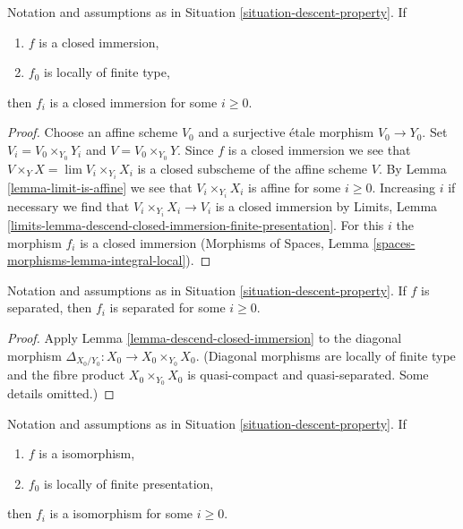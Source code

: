 \begin{lemma}
\label{lemma-descend-closed-immersion}
Notation and assumptions as in Situation \ref{situation-descent-property}. If
\begin{enumerate}
\item $f$ is a closed immersion,
\item $f_0$ is locally of finite type,
\end{enumerate}
then $f_i$ is a closed immersion for some $i \geq 0$.
\end{lemma}

\begin{proof}
Choose an affine scheme $V_0$ and a surjective \'etale morphism $V_0 \to Y_0$.
Set $V_i = V_0 \times_{Y_0} Y_i$ and $V = V_0 \times_{Y_0} Y$.
Since $f$ is a closed immersion we see that
$V \times_Y X = \lim V_i \times_{Y_i} X_i$
is a closed subscheme of the affine scheme $V$. By
Lemma \ref{lemma-limit-is-affine} we see that
$V_i \times_{Y_i} X_i$ is affine for some $i \geq 0$. Increasing $i$ if
necessary we find that $V_i \times_{Y_i} X_i \to V_i$ is a closed immersion by
Limits, Lemma \ref{limits-lemma-descend-closed-immersion-finite-presentation}.
For this $i$ the morphism $f_i$ is a closed immersion
(Morphisms of Spaces, Lemma \ref{spaces-morphisms-lemma-integral-local}).
\end{proof}

\begin{lemma}
\label{lemma-descend-separated-morphism}
Notation and assumptions as in Situation \ref{situation-descent-property}.
If $f$ is separated, then $f_i$ is separated for some $i \geq 0$.
\end{lemma}

\begin{proof}
Apply Lemma \ref{lemma-descend-closed-immersion}
to the diagonal morphism $\Delta_{X_0/Y_0} : X_0 \to X_0 \times_{Y_0} X_0$.
(Diagonal morphisms are locally of finite type
and the fibre product $X_0 \times_{Y_0} X_0$ is quasi-compact and
quasi-separated. Some details omitted.)
\end{proof}

\begin{lemma}
\label{lemma-descend-isomorphism}
Notation and assumptions as in Situation \ref{situation-descent-property}. If
\begin{enumerate}
\item $f$ is a isomorphism,
\item $f_0$ is locally of finite presentation,
\end{enumerate}
then $f_i$ is a isomorphism for some $i \geq 0$.
\end{lemma}

